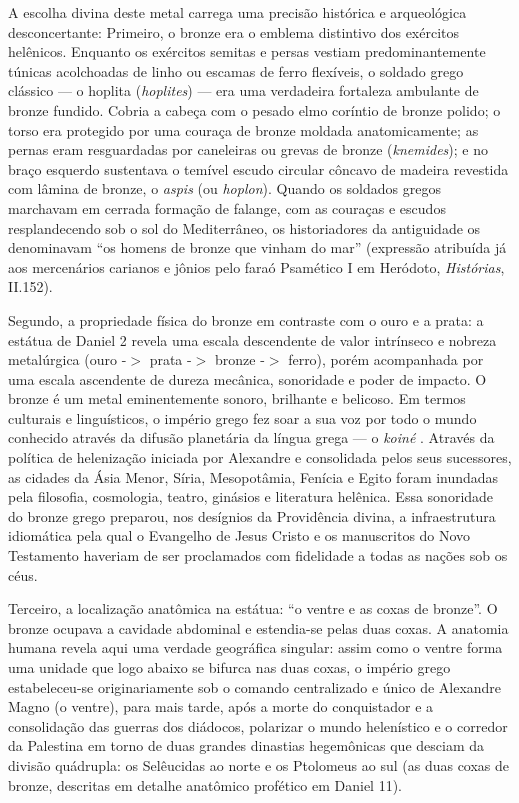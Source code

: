 A escolha divina deste metal carrega uma precisão histórica e arqueológica desconcertante:
Primeiro, o bronze era o emblema distintivo dos exércitos helênicos. Enquanto os exércitos semitas e persas vestiam predominantemente túnicas acolchoadas de linho ou escamas de ferro flexíveis, o soldado grego clássico — o hoplita (\textit{hoplites}) — era uma verdadeira fortaleza ambulante de bronze fundido. Cobria a cabeça com o pesado elmo coríntio de bronze polido; o torso era protegido por uma couraça de bronze moldada anatomicamente; as pernas eram resguardadas por caneleiras ou grevas de bronze (\textit{knemides}); e no braço esquerdo sustentava o temível escudo circular côncavo de madeira revestida com lâmina de bronze, o \textit{aspis} (ou \textit{hoplon}). Quando os soldados gregos marchavam em cerrada formação de falange, com as couraças e escudos resplandecendo sob o sol do Mediterrâneo, os historiadores da antiguidade os denominavam ``os homens de bronze que vinham do mar'' (expressão atribuída já aos mercenários carianos e jônios pelo faraó Psamético I em Heródoto, \textit{Histórias}, II.152).

Segundo, a propriedade física do bronze em contraste com o ouro e a prata: a estátua de Daniel 2 revela uma escala descendente de valor intrínseco e nobreza metalúrgica (ouro -$>$ prata -$>$ bronze -$>$ ferro), porém acompanhada por uma escala ascendente de dureza mecânica, sonoridade e poder de impacto. O bronze é um metal eminentemente sonoro, brilhante e belicoso. Em termos culturais e linguísticos, o império grego fez soar a sua voz por todo o mundo conhecido através da difusão planetária da língua grega — o \textit{koiné} . Através da política de helenização iniciada por Alexandre e consolidada pelos seus sucessores, as cidades da Ásia Menor, Síria, Mesopotâmia, Fenícia e Egito foram inundadas pela filosofia, cosmologia, teatro, ginásios e literatura helênica. Essa sonoridade do bronze grego preparou, nos desígnios da Providência divina, a infraestrutura idiomática pela qual o Evangelho de Jesus Cristo e os manuscritos do Novo Testamento haveriam de ser proclamados com fidelidade a todas as nações sob os céus.

Terceiro, a localização anatômica na estátua: ``o ventre e as coxas de bronze''. O bronze ocupava a cavidade abdominal e estendia-se pelas duas coxas. A anatomia humana revela aqui uma verdade geográfica singular: assim como o ventre forma uma unidade que logo abaixo se bifurca nas duas coxas, o império grego estabeleceu-se originariamente sob o comando centralizado e único de Alexandre Magno (o ventre), para mais tarde, após a morte do conquistador e a consolidação das guerras dos diádocos, polarizar o mundo helenístico e o corredor da Palestina em torno de duas grandes dinastias hegemônicas que desciam da divisão quádrupla: os Selêucidas ao norte e os Ptolomeus ao sul (as duas coxas de bronze, descritas em detalhe anatômico profético em Daniel 11).


